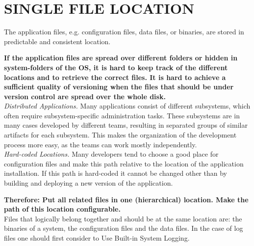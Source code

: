 \newpage
\section*{SINGLE FILE LOCATION}

The application files, e.g. configuration files, data files, or  binaries, are stored in predictable and consistent location.

\begin{center}
  
\end{center}

\textbf{If the application files are spread over different folders or hidden in system-folders of the OS, it is hard to keep track of the different locations and to retrieve the correct files. It is hard to achieve a sufficient quality of versioning when the files that should be under version control are spread over the whole disk.}\\

\textit{Distributed Applications.} Many applications consist of different subsystems, which often require  subsystem-specific administration tasks. These subsystems are in many cases developed by different teams, resulting in separated groups of similar artifacts for each subsystem. This makes the organization of the development process more easy, as the teams can work mostly independently.\\

\textit{Hard-coded Locations.} Many developers tend to choose a good place for configuration files and make this path relative to the location of the application installation. If this path is hard-coded it cannot be changed other than by building and deploying a new version of the application.

\begin{center}
   
\end{center}

\textbf{Therefore: Put all related files in one (hierarchical) location. Make the path of this location configurable.}\\

Files that logically belong together and should be at the same location are: the binaries of a system, the configuration files and the data files. In the case of log files one should first consider to {\sc Use Built-in System Logging}.

